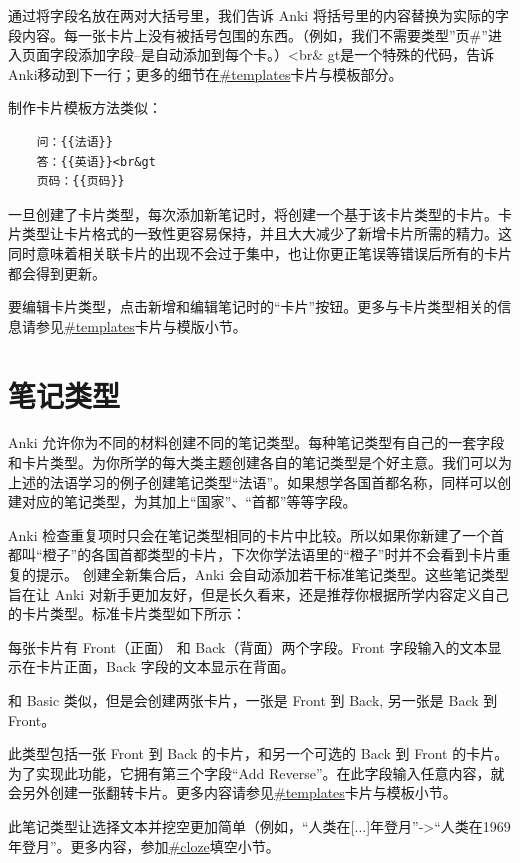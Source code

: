\documentclass[a4paper]{book}
\begin{document}
通过将字段名放在两对大括号里，我们告诉 Anki 将括号里的内容替换为实际的字段内容。每一张卡片上没有被括号包围的东西。（例如，我们不需要类型”页\#”进入页面字段添加字段–是自动添加到每个卡。）<br\& gt是一个特殊的代码，告诉Anki移动到下一行；更多的细节在\url{#templates}卡片与模板部分。

制作卡片模板方法类似：

\begin{shaded}\begin{verbatim}
	问：{{法语}}
	答：{{英语}}<br&gt
	页码：{{页码}}
	\end{verbatim}\end{shaded}

一旦创建了卡片类型，每次添加新笔记时，将创建一个基于该卡片类型的卡片。卡片类型让卡片格式的一致性更容易保持，并且大大减少了新增卡片所需的精力。这同时意味着相关联卡片的出现不会过于集中，也让你更正笔误等错误后所有的卡片都会得到更新。

要编辑卡片类型，点击新增和编辑笔记时的“卡片”按钮。更多与卡片类型相关的信息请参见\url{#templates}卡片与模版小节。

\section{笔记类型}

Anki 允许你为不同的材料创建不同的笔记类型。每种笔记类型有自己的一套字段和卡片类型。为你所学的每大类主题创建各自的笔记类型是个好主意。我们可以为上述的法语学习的例子创建笔记类型“法语”。如果想学各国首都名称，同样可以创建对应的笔记类型，为其加上“国家”、“首都”等等字段。

Anki 检查重复项时只会在笔记类型相同的卡片中比较。所以如果你新建了一个首都叫“橙子”的各国首都类型的卡片，下次你学法语里的“橙子”时并不会看到卡片重复的提示。
创建全新集合后，Anki 会自动添加若干标准笔记类型。这些笔记类型旨在让 Anki 对新手更加友好，但是长久看来，还是推荐你根据所学内容定义自己的卡片类型。标准卡片类型如下所示：

\begin{description}
	\itemsep1pt\parskip0pt
	\item[Basic] 每张卡片有 Front（正面） 和 Back（背面）两个字段。Front 字段输入的文本显示在卡片正面，Back 字段的文本显示在背面。
	\item[标准（翻转卡片）] 和 Basic 类似，但是会创建两张卡片，一张是 Front 到 Back, 另一张是 Back 到 Front。
	\item[标准（可选翻转卡片）] 此类型包括一张 Front 到 Back 的卡片，和另一个可选的 Back 到 Front 的卡片。为了实现此功能，它拥有第三个字段“Add Reverse”。在此字段输入任意内容，就会另外创建一张翻转卡片。更多内容请参见\url{#templates}卡片与模板小节。
	\item[Cloze] 此笔记类型让选择文本并挖空更加简单（例如，“人类在[...]年登月”->“人类在1969年登月”。更多内容，参加\url{#cloze}填空小节。
\end{description}
\end{document}
